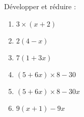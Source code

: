 
\begin{exercice}\label{exosmath-0980}

    Développer et réduire :
    \begin{multicols}{2}
        \begin{enumerate}
            \item
                \( 3\times (x+2)\)
            \item
                \( 2(4-x)\)
            \item
                \( 7(1+3x)\)
            \item
                \( (5+6x)\times 8-30\)
            \item
                \( (5+6x)\times 8-30x\)
            \item
                \( 9(x+1)-9x\)
        \end{enumerate}
    \end{multicols}

\end{exercice}
